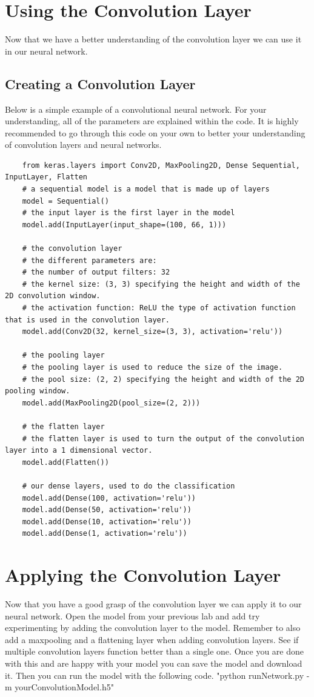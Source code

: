 \documentclass[11pt]{report}
\begin{document}
\clearpage

\chapter{Using the Convolution Layer}
Now that we have a better understanding of the convolution layer we can use it in our neural network.
\section{Creating a Convolution Layer}
Below is a simple example of a convolutional neural network. For your understanding, all of the parameters are explained within the code. It is highly recommended to go through this code on your own to better your understanding of convolution layers and neural networks.
\begin{verbatim} 
    from keras.layers import Conv2D, MaxPooling2D, Dense Sequential, InputLayer, Flatten
    # a sequential model is a model that is made up of layers
    model = Sequential()
    # the input layer is the first layer in the model
    model.add(InputLayer(input_shape=(100, 66, 1)))

    # the convolution layer
    # the different parameters are:
    # the number of output filters: 32
    # the kernel size: (3, 3) specifying the height and width of the 2D convolution window.
    # the activation function: ReLU the type of activation function that is used in the convolution layer.
    model.add(Conv2D(32, kernel_size=(3, 3), activation='relu'))

    # the pooling layer
    # the pooling layer is used to reduce the size of the image.
    # the pool size: (2, 2) specifying the height and width of the 2D pooling window.
    model.add(MaxPooling2D(pool_size=(2, 2)))

    # the flatten layer
    # the flatten layer is used to turn the output of the convolution layer into a 1 dimensional vector.
    model.add(Flatten())

    # our dense layers, used to do the classification
    model.add(Dense(100, activation='relu'))
    model.add(Dense(50, activation='relu'))
    model.add(Dense(10, activation='relu'))
    model.add(Dense(1, activation='relu'))
\end{verbatim}

\chapter{Applying the Convolution Layer}
Now that you have a good grasp of the convolution layer we can apply it to our neural network. Open the model from your previous lab and add try experimenting by adding the convolution layer to the model. Remember to also add a maxpooling and a flattening layer when adding convolution layers. See if multiple convolution layers function better than a single one. Once you are done with this and are happy with your model you can save the model and download it. Then you can run the model with the following code.
"python runNetwork.py -m yourConvolutionModel.h5"
\end{document}

